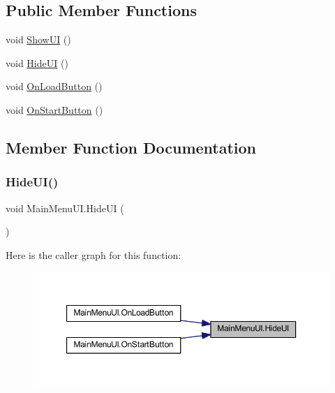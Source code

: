 \subsection*{Public Member Functions}
\begin{DoxyCompactItemize}
\item 
void \mbox{\hyperlink{class_main_menu_u_i_ab70d817a22e65d2258cfd0d9a48404a8}{Show\+UI}} ()
\item 
void \mbox{\hyperlink{class_main_menu_u_i_a880a33ba6d600fee9ee4635b94bded8c}{Hide\+UI}} ()
\item 
void \mbox{\hyperlink{class_main_menu_u_i_ab97fc6c28c9bfe985c650c7572aec0fc}{On\+Load\+Button}} ()
\item 
void \mbox{\hyperlink{class_main_menu_u_i_ac567ba394028f00989750f4782325daf}{On\+Start\+Button}} ()
\end{DoxyCompactItemize}


\subsection{Member Function Documentation}
\mbox{\label{class_main_menu_u_i_a880a33ba6d600fee9ee4635b94bded8c}} 
\subsubsection{\texorpdfstring{HideUI()}{HideUI()}}
{\footnotesize\ttfamily void Main\+Menu\+U\+I.\+Hide\+UI (\begin{DoxyParamCaption}{ }\end{DoxyParamCaption})}

Here is the caller graph for this function\+:
\nopagebreak
\begin{figure}[H]
\begin{center}
\leavevmode
\includegraphics[width=350pt]{class_main_menu_u_i_a880a33ba6d600fee9ee4635b94bded8c_icgraph}
\end{center}
\end{figure}
\mbox{\label{class_main_menu_u_i_ab97fc6c28c9bfe985c650c7572aec0fc}} 
